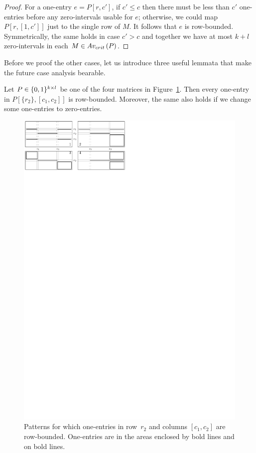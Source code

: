 \begin{proof}
For a one-entry $e=P[r,c']$, if $c'\leq c$ then there must be less than $c'$ one-entries before any zero-intervals usable for $e$; otherwise, we could map $P[r,[1,c']]$ just to the single row of $M$. It follows that $e$ is row-bounded. Symmetrically, the same holds in case $c'>c$ and together we have at most $k+l$ zero-intervals in each $M\in Av_{crit}\left(P\right)$.
\end{proof}

Before we proof the other cases, let us introduce three useful lemmata that make the future case analysis bearable.

\begin{lemma}
\label{lemma:H}
Let $P\in\{0,1\}^{k\times l}$ be one of the four matrices in Figure~\ref{fig:lemmaH}. Then every one-entry in $P[\{r_2\},[c_1,c_2]]$ is row-bounded. Moreover, the same also holds if we change some one-entries to zero-entries.

\begin{figure}[!ht]
\centering
\includegraphics[width=\textwidth]{img/lemmaH.pdf}
\caption{Patterns for which one-entries in row~$r_2$ and columns $[c_1,c_2]$ are row-bounded. One-entries are in the areas enclosed by bold lines and on bold lines.}
\label{fig:lemmaH}
\end{figure}
\end{lemma}
